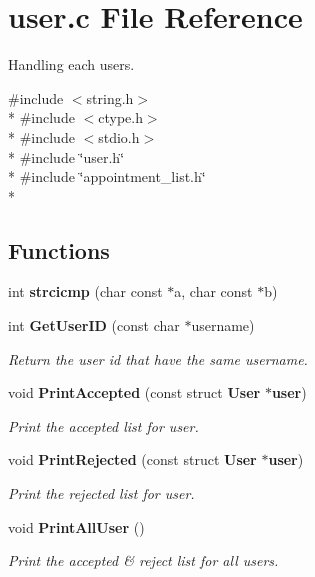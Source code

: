 \section{user.\+c File Reference}
\label{user_8c}


Handling each users.  


{\ttfamily \#include $<$string.\+h$>$}\\*
{\ttfamily \#include $<$ctype.\+h$>$}\\*
{\ttfamily \#include $<$stdio.\+h$>$}\\*
{\ttfamily \#include \char`\"{}user.\+h\char`\"{}}\\*
{\ttfamily \#include \char`\"{}appointment\+\_\+list.\+h\char`\"{}}\\*
\subsection*{Functions}
\begin{DoxyCompactItemize}
\item 
int {\bfseries strcicmp} (char const $\ast$a, char const $\ast$b)\label{user_8c_ae2842cb0cbdf6aa210eba0b735e63312}

\item 
int {\bf Get\+User\+I\+D} (const char $\ast$username)
\begin{DoxyCompactList}\small\item\em Return the user id that have the same username. \end{DoxyCompactList}\item 
void {\bf Print\+Accepted} (const struct {\bf User} $\ast${\bf user})\label{user_8c_a1214e8672d5a6d823eb2934cf5a82d0b}

\begin{DoxyCompactList}\small\item\em Print the accepted list for user. \end{DoxyCompactList}\item 
void {\bf Print\+Rejected} (const struct {\bf User} $\ast${\bf user})\label{user_8c_afb40dc85cc1d4b23f9a1a95ef4abc6f5}

\begin{DoxyCompactList}\small\item\em Print the rejected list for user. \end{DoxyCompactList}\item 
void {\bf Print\+All\+User} ()\label{user_8c_a393641d36b97cdf5764c257c9c259734}

\begin{DoxyCompactList}\small\item\em Print the accepted \& reject list for all users. \end{DoxyCompactList}\end{DoxyCompactItemize}


